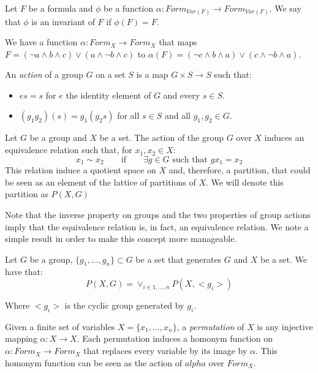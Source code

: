 \begin{definition}
Let $F$ be a formula and $\phi$ be a function $\alpha:Form_{Var(F)}\to Form_{Var(F)}$. We say that $\phi$ is an invariant of $F$ if $\phi(F) = F$.
\end{definition}

 We have a function $\alpha :Form_{X}\to Form_{X}$ that maps $F = (\neg a \land b  \land c) \lor (a \land \neg b \land c)$ to $\alpha(F) = (\neg c \land b  \land a) \lor (c \land \neg b \land a)$.\\



 \begin{definition}
  An \emph{action} of a group $G$ on a set $S$ is a map $G \times S \to S$ such that:
  \begin{itemize}
  \item $es = s$ for $e$ the identity element of $G$ and every $s\in S$.
  \item $(g_1g_2)(s) = g_1(g_2s)$ for all $s \in S$ and all $g_1,g_2\in G$.
    \end{itemize}
\end{definition}


\begin{definition}
  Let $G$ be a group and $X$ be a set. The action of the group $G$ over $X$ induces an equivalence relation such that, for $x_1,x_2 \in X$:
  $$x_1 \sim x_2 \qquad \text{if} \qquad  \exists g\in G\text{ such that } gx_1=x_2 $$
  This relation induce a quotient space on $X$ and, therefore, a partition, that could be seen as an element of the lattice of partitions of $X$. We will denote this partition as $P(X,G)$
\end{definition}

Note that the inverse property on groups and the two properties of group actions imply that the equivalence relation is, in fact, an equivalence relation. We note a simple result in order to make this concept more manageable.

\begin{proposition}
  Let $G$ be a group, $\{g_1,...,g_n\}\subset G$ be a set that generates $G$ and $X$ be a set. We have that:
  $$P(X,G) = \lor_{i\in 1,...,n} P(X,<g_i>) $$

  Where $<g_i>$ is the cyclic group generated by $g_i$.
\end{proposition}

    
\begin{definition}[Permutation]
    Given a finite set of variables $X = \{x_1,...,x_n\}$, a \emph{permutation} of $X$ is any injective mapping $\alpha:X \to X$. Each permutation induces a homonym function on $\alpha: Form_X \to Form_X$  that replaces every variable by its image by $\alpha$. This homonym function can be seen as the action of $alpha$ over $Form_X$.
\end{definition}

